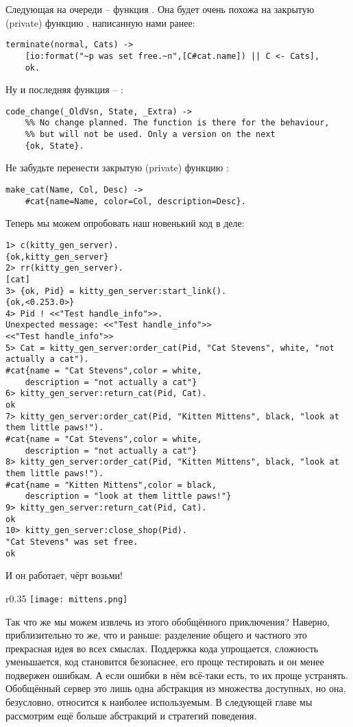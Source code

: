 Следующая на очереди \--- функция .
Она будет очень похожа на закрытую (private) функцию , написанную нами ранее:
\begin{lstlisting}[style=erlang]
terminate(normal, Cats) ->
    [io:format("~p was set free.~n",[C#cat.name]) || C <- Cats],
    ok.
\end{lstlisting}
Ну и последняя функция \--- :
\begin{lstlisting}[style=erlang]
code_change(_OldVsn, State, _Extra) ->
    %% No change planned. The function is there for the behaviour,
    %% but will not be used. Only a version on the next
    {ok, State}.
\end{lstlisting}
Не забудьте перенести закрытую (private) функцию :
\begin{lstlisting}[style=erlang]
%%% Private functions
make_cat(Name, Col, Desc) ->
    #cat{name=Name, color=Col, description=Desc}.
\end{lstlisting}
Теперь мы можем опробовать наш новенький код в деле:
\begin{lstlisting}[style=erlang]
1> c(kitty_gen_server).
{ok,kitty_gen_server}
2> rr(kitty_gen_server).
[cat]
3> {ok, Pid} = kitty_gen_server:start_link().
{ok,<0.253.0>}
4> Pid ! <<"Test handle_info">>.
Unexpected message: <<"Test handle_info">>
<<"Test handle_info">>
5> Cat = kitty_gen_server:order_cat(Pid, "Cat Stevens", white, "not actually a cat").
#cat{name = "Cat Stevens",color = white,
    description = "not actually a cat"}
6> kitty_gen_server:return_cat(Pid, Cat).
ok
7> kitty_gen_server:order_cat(Pid, "Kitten Mittens", black, "look at them little paws!").
#cat{name = "Cat Stevens",color = white,
    description = "not actually a cat"}
8> kitty_gen_server:order_cat(Pid, "Kitten Mittens", black, "look at them little paws!").
#cat{name = "Kitten Mittens",color = black,
    description = "look at them little paws!"}
9> kitty_gen_server:return_cat(Pid, Cat).
ok      
10> kitty_gen_server:close_shop(Pid).
"Cat Stevens" was set free.
ok
\end{lstlisting}
И он работает, чёрт возьми!

\begin{wrapfigure}{r}{0.35\linewidth}
    \texttt{[image: mittens.png]}
\end{wrapfigure}
Так что же мы можем извлечь из этого обобщённого приключения?
Наверно, приблизительно то же, что и раньше: разделение общего и частного это прекрасная идея во всех смыслах.
Поддержка кода упрощается, сложность уменьшается, код становится безопаснее, его проще тестировать и он менее подвержен ошибкам.
А если ошибки в нём всё\--таки есть, то их проще устранять.
Обобщённый сервер это лишь одна абстракция из множества доступных, но она, безусловно, относится к наиболее используемым.
В следующей главе мы рассмотрим ещё больше абстракций и стратегий поведения.
